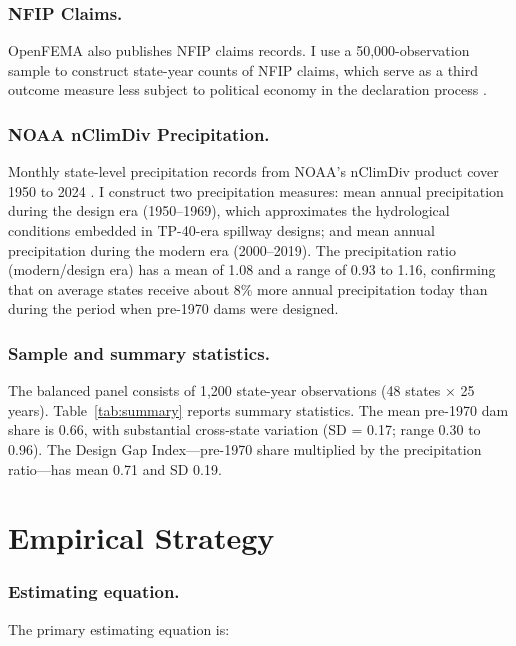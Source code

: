 \documentclass[12pt]{article}
\begin{document}
\subsubsection*{NFIP Claims.}

OpenFEMA also publishes NFIP claims records. I use a 50,000-observation sample to construct state-year counts of NFIP claims, which serve as a third outcome measure less subject to political economy in the declaration process \citep{gallagher2014}.

\subsubsection*{NOAA nClimDiv Precipitation.}

Monthly state-level precipitation records from NOAA's nClimDiv product cover 1950 to 2024 \citep{noaa2015}. I construct two precipitation measures: mean annual precipitation during the design era (1950--1969), which approximates the hydrological conditions embedded in TP-40-era spillway designs; and mean annual precipitation during the modern era (2000--2019). The precipitation ratio (modern/design era) has a mean of 1.08 and a range of 0.93 to 1.16, confirming that on average states receive about 8\% more annual precipitation today than during the period when pre-1970 dams were designed.

\subsubsection*{Sample and summary statistics.}

The balanced panel consists of 1,200 state-year observations (48 states $\times$ 25 years). Table~\ref{tab:summary} reports summary statistics. The mean pre-1970 dam share is 0.66, with substantial cross-state variation (SD = 0.17; range 0.30 to 0.96). The Design Gap Index---pre-1970 share multiplied by the precipitation ratio---has mean 0.71 and SD 0.19.



\section{Empirical Strategy}

\subsubsection*{Estimating equation.}

The primary estimating equation is:
\end{document}
